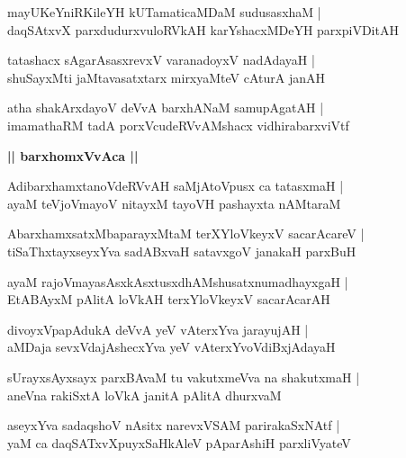 \documentclass[twoside,12pt,openright]{book}
\newcounter{shloka}[chapter]
\def\uvaca#1{\centerline{{\large\textbf{#1}}}}
\begin{document}
\begin{shloka}%
mayUKeYniRKileYH kUTamaticaMDaM sudusasxhaM |\\
daqSAtxvX parxdudurxvuloRVkAH karYshacxMDeYH parxpiVDitAH 
\end{shloka}

\begin{shloka}%
tatashacx sAgarAsasxrevxV varanadoyxV nadAdayaH |\\
shuSayxMti jaMtavasatxtarx mirxyaMteV cAturA janAH 
\end{shloka}

\begin{shloka}%
atha shakArxdayoV deVvA barxhANaM samupAgatAH |\\
imamathaRM tadA porxVcudeRVvAMshacx vidhirabarxviVtf 
\end{shloka}

\uvaca{|| barxhomxVvAca ||}

\begin{shloka}%
AdibarxhamxtanoVdeRVvAH saMjAtoVpusx ca tatasxmaH |\\
ayaM teVjoVmayoV nitayxM tayoVH pashayxta nAMtaraM
\end{shloka}

\begin{shloka}%
AbarxhamxsatxMbaparayxMtaM terXYloVkeyxV sacarAcareV |\\
tiSaThxtayxseyxYva sadABxvaH satavxgoV janakaH parxBuH
\end{shloka}

\begin{shloka}%
ayaM rajoVmayasAsxkAsxtusxdhAMshusatxnumadhayxgaH |\\
EtABAyxM pAlitA loVkAH terxYloVkeyxV sacarAcarAH 
\end{shloka}

\begin{shloka}%
divoyxVpapAdukA deVvA yeV vAterxYva jarayujAH |\\
aMDaja sevxVdajAshecxYva yeV vAterxYvoVdiBxjAdayaH
\end{shloka}

\begin{shloka}%
sUrayxsAyxsayx parxBAvaM tu vakutxmeVva na shakutxmaH |\\
aneVna rakiSxtA loVkA janitA pAlitA dhurxvaM 
\end{shloka}

\begin{shloka}%
aseyxYva sadaqshoV nAsitx narevxVSAM parirakaSxNAtf |\\
yaM ca daqSATxvXpuyxSaHkAleV pAparAshiH parxliVyateV 
\end{shloka}
\end{document}
